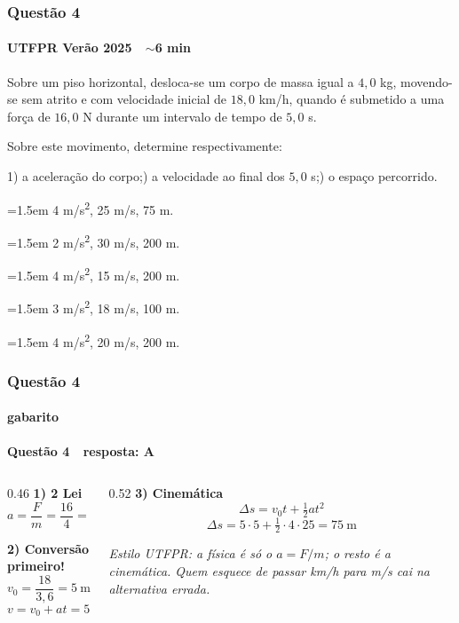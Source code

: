 \documentclass[aspectratio=169,12pt]{beamer}
\newcommand{\optitem}[2]{%
  \par\hangindent=1.5em\hangafter=1
  \makebox[1.5em][l]{\textbf{#1)}}#2}
\newcommand{\alternativas}[5]{%
  \par\vspace{0.55em}%
  \begingroup\setlength{\parskip}{0.30em}%
  \optitem{a}{#1}\optitem{b}{#2}\optitem{c}{#3}\optitem{d}{#4}\optitem{e}{#5}%
  \par\endgroup}
\newcommand{\resposta}[2]{%
  \par\vspace{0.2em}
  {\Large\bfseries\color{vinho}Quest\~ao #1 \,\textemdash\, resposta: #2}
  \par\vspace{0.6em}}
\begin{document}
\begin{frame}
\frametitle{Quest\~ao 4}
\framesubtitle{UTFPR Ver\~ao 2025 \,\textperiodcentered\, $\sim$6 min}

\small
Sobre um piso horizontal, desloca-se um corpo de massa igual a
$4{,}0$ kg, movendo-se sem atrito e com velocidade inicial de
$18{,}0$ km/h, quando \'e submetido a uma for\c{c}a de $16{,}0$ N
durante um intervalo de tempo de $5{,}0$ s.

\vspace{0.4em}
Sobre este movimento, determine respectivamente:

\vspace{0.2em}
\hspace{1em}1) a acelera\c{c}\~ao do corpo;) a velocidade ao final dos $5{,}0$ s;) o espa\c{c}o percorrido.

\alternativas{4 m/s\textsuperscript{2}, 25 m/s, 75 m.}%
{2 m/s\textsuperscript{2}, 30 m/s, 200 m.}%
{4 m/s\textsuperscript{2}, 15 m/s, 200 m.}%
{3 m/s\textsuperscript{2}, 18 m/s, 100 m.}%
{4 m/s\textsuperscript{2}, 20 m/s, 200 m.}
\end{frame}

\begin{frame}
\frametitle{Quest\~ao 4}
\framesubtitle{gabarito}
\resposta{4}{A}

\begin{columns}[T]
\begin{column}{0.46\textwidth}
\textbf{1) 2\textordfeminine{} Lei}
\[ a = \frac{F}{m} = \frac{16}{4} = 4\ \text{m/s}^2 \]

\textbf{2) Convers\~ao primeiro!}
\[ v_0 = \frac{18}{3{,}6} = 5\ \text{m/s} \]
\[ v = v_0 + at = 5 + 4\cdot 5 = 25\ \text{m/s} \]
\end{column}
\begin{column}{0.52\textwidth}
\textbf{3) Cinem\'atica}
\[ \Delta s = v_0 t + \tfrac{1}{2}a t^2 \]
\[ \Delta s = 5\cdot 5 + \tfrac{1}{2}\cdot 4\cdot 25 = 75\ \text{m} \]

\vspace{0.6em}
{\color{grafite}\itshape Estilo UTFPR: a f\'isica \'e s\'o o
$a = F/m$; o resto \'e a cinemática. Quem esquece de
passar km/h para m/s cai na alternativa errada.}
\end{column}
\end{columns}
\end{frame}
\end{document}
